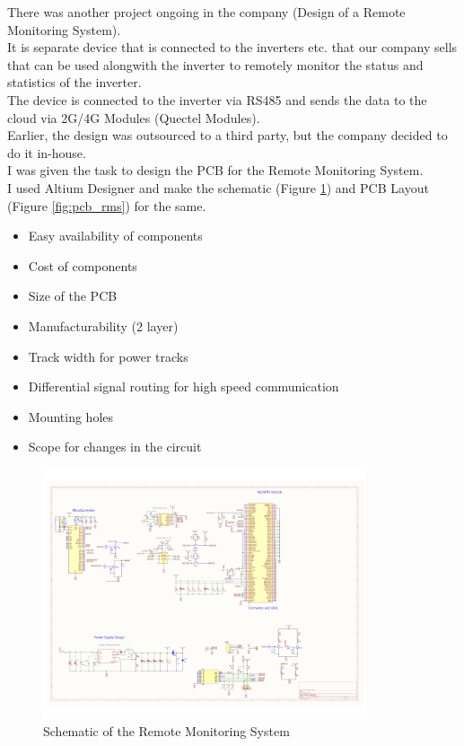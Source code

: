 There was another project ongoing in the company (Design of a Remote Monitoring System).\\
\noindent
It is separate device that is connected to the inverters etc. that our company sells that can be used alongwith the inverter to remotely monitor the status and statistics of the inverter.\\
\noindent
The device is connected to the inverter via RS485 and sends the data to the cloud via 2G/4G Modules (Quectel Modules).\\
\noindent
Earlier, the design was outsourced to a third party, but the company decided to do it in-house.\\
\noindent
I was given the task to design the PCB for the Remote Monitoring System.\\
\noindent
I used Altium Designer and make the schematic (Figure \ref*{fig:schematic_rms}) and PCB Layout (Figure \ref*{fig:pcb_rms}) for the same.
\begin{multicols}{2}
\begin{itemize}
    \item Easy availability of components
    \item Cost of components
    \item Size of the PCB
    \item Manufacturability (2 layer)
    \item Track width for power tracks
    \item Differential signal routing for high speed communication
    \item Mounting holes
    \item Scope for changes in the circuit
\end{itemize}
\end{multicols}
\begin{figure}[H]
    \centering
    \includegraphics[width=0.85\textwidth]{images/schematic.png}
    \caption{Schematic of the Remote Monitoring System}
    \label{fig:schematic_rms}
\end{figure}
